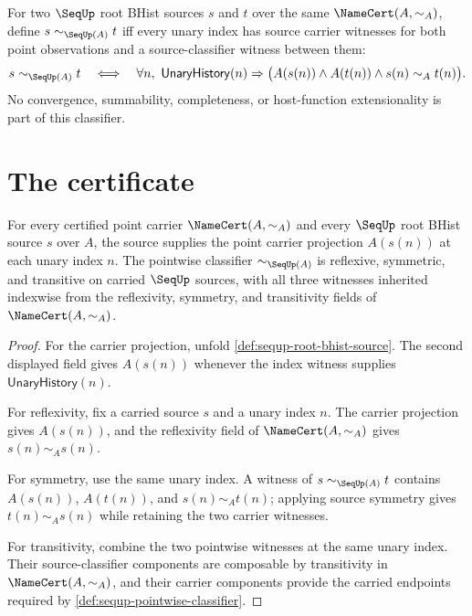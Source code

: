 \begin{definition}
\label{def:sequp-pointwise-classifier}
For two $\SeqUp$ root BHist sources $s$ and $t$ over the same $\NameCert(A,\sim_A)$, define $s\sim_{\SeqUp(A)}t$ iff every unary index has source carrier witnesses for both point observations and a source-classifier witness between them:
$$
s\sim_{\SeqUp(A)}t
\quad\Longleftrightarrow\quad
\forall n,\ \mathsf{UnaryHistory}(n)\Rightarrow
\bigl(A(s(n))\wedge A(t(n))\wedge s(n)\sim_A t(n)\bigr).
$$
No convergence, summability, completeness, or host-function extensionality is part of this classifier.
\end{definition}

\section{The certificate}
\label{sec:seq-certificate}

\begin{theorem}
\label{thm:sequp-carrier-classifier-obligations}
For every certified point carrier $\NameCert(A,\sim_A)$ and every $\SeqUp$ root BHist source $s$ over $A$, the source supplies the point carrier projection $A(s(n))$ at each unary index $n$. The pointwise classifier $\sim_{\SeqUp(A)}$ is reflexive, symmetric, and transitive on carried $\SeqUp$ sources, with all three witnesses inherited indexwise from the reflexivity, symmetry, and transitivity fields of $\NameCert(A,\sim_A)$.
\end{theorem}

\begin{proof}
For the carrier projection, unfold \autoref{def:sequp-root-bhist-source}. The second displayed field gives $A(s(n))$ whenever the index witness supplies $\mathsf{UnaryHistory}(n)$.

For reflexivity, fix a carried source $s$ and a unary index $n$. The carrier projection gives $A(s(n))$, and the reflexivity field of $\NameCert(A,\sim_A)$ gives $s(n)\sim_A s(n)$.

For symmetry, use the same unary index. A witness of $s\sim_{\SeqUp(A)}t$ contains $A(s(n))$, $A(t(n))$, and $s(n)\sim_A t(n)$; applying source symmetry gives $t(n)\sim_A s(n)$ while retaining the two carrier witnesses.

For transitivity, combine the two pointwise witnesses at the same unary index. Their source-classifier components are composable by transitivity in $\NameCert(A,\sim_A)$, and their carrier components provide the carried endpoints required by \autoref{def:sequp-pointwise-classifier}.
\end{proof}

